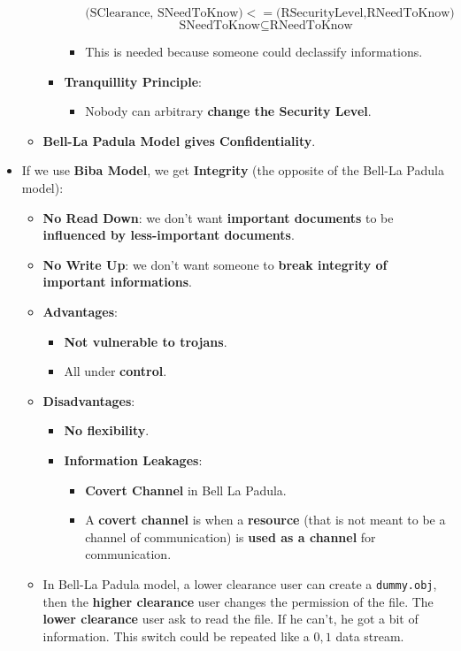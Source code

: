 \documentclass[9pt, letterpaper]{article}
\begin{document}
\begin{itemize}
\begin{itemize}
\begin{itemize}
\begin{itemize}
				$$(\mbox{SClearance, SNeedToKnow)} <= (\mbox{RSecurityLevel,RNeedToKnow)}$$
				$$\mbox{SNeedToKnow} \subseteq \mbox{RNeedToKnow}$$
				\item This is needed because someone could declassify informations.
			\end{itemize}			 
			\item \textbf{Tranquillity Principle}: 
			\begin{itemize}
				\item Nobody can arbitrary \textbf{change the Security Level}.
			\end{itemize}
		\end{itemize}
		\item \textbf{Bell-La Padula Model gives Confidentiality}.
	\end{itemize}
	\item If we use \textbf{Biba Model}, we get \textbf{Integrity} (the opposite of the Bell-La Padula model):
	\begin{itemize}
		\item \textbf{No Read Down}: we don't want \textbf{important documents} to be \textbf{influenced by less-important documents}.
		\item \textbf{No Write Up}: we don't want someone to \textbf{break integrity of important informations}.
		\item \textbf{Advantages}:
		\begin{itemize}
			\item \textbf{Not vulnerable to trojans}.
			\item All under \textbf{control}.
		\end{itemize}
		\item \textbf{Disadvantages}:
		\begin{itemize}
			\item \textbf{No flexibility}.
			\item \textbf{Information Leakages}:
			\begin{itemize}
				\item \textbf{Covert Channel} in Bell La Padula.
				\item A \textbf{covert channel} is when a \textbf{resource} (that is not meant to be a channel of communication) is \textbf{used as a channel} for communication.
			\end{itemize}
		\end{itemize}
		\item In Bell-La Padula model, a lower clearance user can create a {\tt dummy.obj}, then the \textbf{higher clearance} user changes the permission of the file. The \textbf{lower clearance} user ask to read the file. If he can't, he got a bit of information. This switch could be repeated like a $0,1$ data stream.
	\end{itemize}
\end{itemize}
\end{document}
